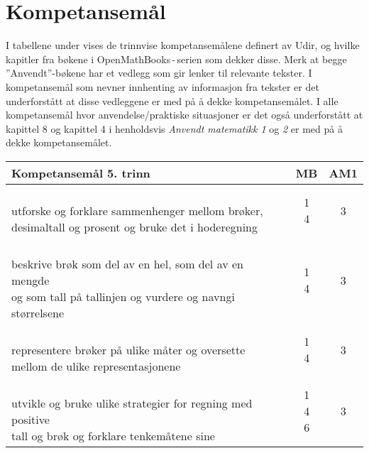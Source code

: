 \documentclass{article}
\begin{document}
\section*{Kompetansemål}
I tabellene under vises de trinnvise kompetansemålene definert av Udir, og hvilke kapitler fra bøkene i OpenMathBooks\,-\,serien som dekker disse. Merk at begge ''Anvendt''-bøkene har et vedlegg som gir lenker til relevante tekster. I kompetansemål som nevner innhenting av informasjon fra tekster er det underforstått at disse vedleggene er med på å dekke kompetansemålet. I alle kompetansemål hvor anvendelse/praktiske situasjoner er det også underforstått at kapittel 8 og kapittel 4 i henholdsvis \textsl{Anvendt matematikk 1} og \textsl{2} er med på å dekke kompetansemålet.
\newpage
\begin{center}
	\begin{tabular}{p{10.5cm} | c | c |} 
	\textbf{Kompetansemål 5. trinn} & \textbf{MB} & \textbf{AM1}\\ \hline
\shortstack[l]{\\utforske og forklare sammenhenger mellom brøker,\\ desimaltall og prosent og bruke det i hoderegning} &\shortstack{1 \\4} &\shortstack{3\\{}} \\ \hline
	
\shortstack[l]{\\beskrive brøk som del av en hel, som del av en mengde\\ og som tall på tallinjen og vurdere og navngi størrelsene} &\shortstack{1\\4} &\shortstack{3\\{}} \\ \hline

\shortstack[l]{\\representere brøker på ulike måter og oversette\\ mellom de ulike representasjonene
} &\shortstack{1 \\4} &\shortstack{3\\{}} \\ \hline

\shortstack[l]{\\utvikle og bruke ulike strategier for regning med positive \\tall og brøk og forklare tenkemåtene sine \\{}
} &\shortstack{1\\4\\6} &\shortstack{3\\{}} \\ \hline	


\end{tabular}
\end{center}
\end{document}
